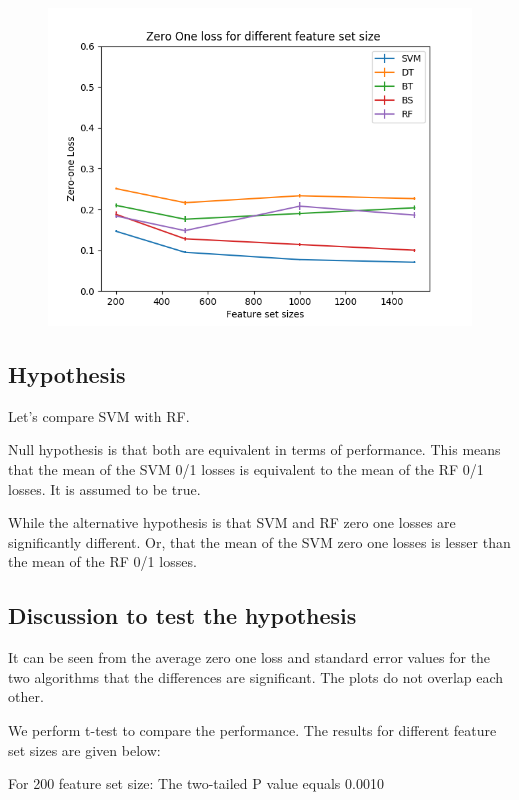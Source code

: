 \documentclass[12pt]{article}
\begin{document}
\begin{figure}
	\centering
	\includegraphics{Analysis2.png}
\end{figure}

\subsection{Hypothesis}

Let's compare SVM with RF. 

Null hypothesis is that both are equivalent in terms of performance. This means that the 
mean of the SVM 0/1 losses is equivalent to the mean of the RF 0/1 losses. It is assumed
to be true. 

While the alternative hypothesis is that SVM and RF zero one losses are significantly different.
Or, that the mean of the SVM zero one losses is lesser than the mean of the RF 0/1 losses.

\subsection{Discussion to test the hypothesis}

It can be seen from the average zero one loss and standard error values for the two algorithms
that the differences are significant. The plots do not overlap each other.

We perform t-test to compare the performance. The results for different feature set sizes are given below:

For 200 feature set size:
  The two-tailed P value equals 0.0010   \\
\end{document}
